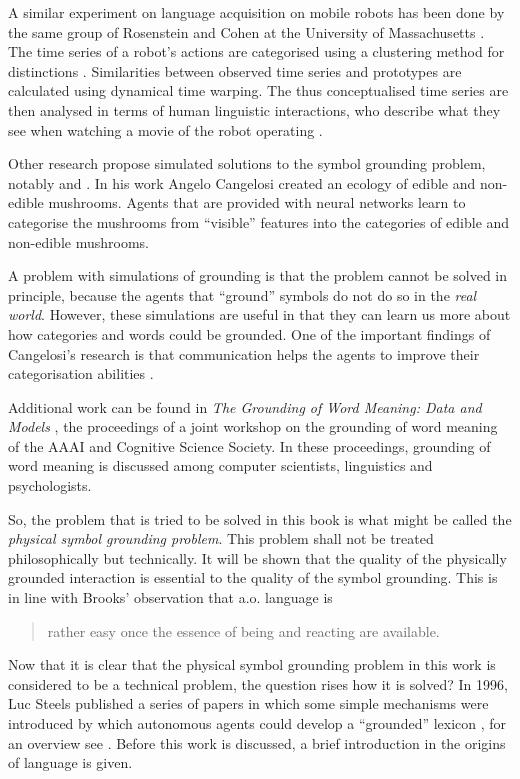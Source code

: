 A similar experiment on language acquisition on mobile robots has been done by the same group of Rosenstein and Cohen at the University of Massachusetts \citep{oatesetal:1999}. The time series of a robot's actions are categorised using a clustering method for distinctions \citep{oates:1999}. Similarities between observed time series and prototypes are calculated using dynamical time warping. The thus conceptualised time series are then analysed in terms of human linguistic interactions, who describe what they see when watching a movie of the robot operating \citep{oatesetal:1999}.


Other research propose simulated solutions to the symbol grounding problem, notably \citet{cangelosiparisi:1998} and \citet{cangelosi:1998}. In his work Angelo Cangelosi created an ecology of edible and non-edible mushrooms. Agents that are provided with neural networks learn to categorise the mushrooms from ``visible'' features into the categories of edible and non-edible mushrooms.

A problem with simulations of grounding is that the problem cannot be solved in principle, because the agents that ``ground'' symbols do not do so in the {\em real world}. However, these simulations are useful in that they can learn us more about how categories and words could be grounded.  One of the important findings of Cangelosi's research is that communication helps the agents to improve their categorisation abilities \citep{cangelosiharnad:2000}.

Additional work can be found in {\em The Grounding of Word Meaning: Data and Models} \citep{gasser:1998}, the proceedings of a joint workshop on the grounding of word meaning of the AAAI and Cognitive Science Society. In these proceedings, grounding of word meaning is discussed among computer scientists, linguistics and psychologists. 


So, the problem that is tried to be solved in this book is what might be called the {\em physical symbol grounding problem}. This problem shall not be treated philosophically but technically. It will be shown that the quality of the physically grounded interaction is essential to the quality of the symbol grounding. This is in line with Brooks' observation that a.o. language is 

\begin{quote}
rather easy once the essence of being and reacting are available. \citep{brooks:1990}
\end{quote}

Now that it is clear that the physical symbol grounding problem in this work is considered to be a technical problem, the question rises how it is solved? In 1996, Luc Steels published a series of papers in which some simple mechanisms were introduced by which autonomous agents could develop a ``grounded'' lexicon \citep{steels:1996a,steels:1996b,steels:1996d,steels:1996e}, for an overview see \citealt{steels:1997b}. Before this work is discussed, a brief introduction in the origins of language is given.

